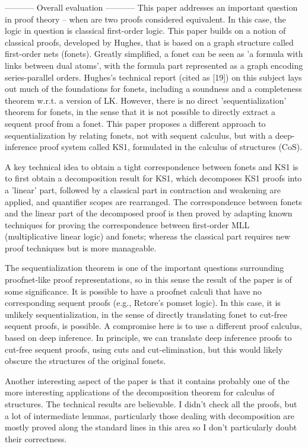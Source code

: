 ----------- Overall evaluation -----------
This paper addresses an important question in proof theory -- when are two proofs considered equivalent. In this case, the logic in question is classical first-order logic. This paper builds on a notion of classical proofs, developed by Hughes, that is based on a graph structure called first-order nets (fonets). Greatly simplified, a fonet can be seen as 'a formula with links between dual atoms', with the formula part represented as a graph encoding series-parallel orders.
Hughes's technical report (cited as [19]) on this subject lays out much of the foundations for fonets, including a soundness and a completeness theorem w.r.t. a version of LK. However, there is no direct 'sequentialization' theorem for fonets, in the sense that it is not possible to directly extract a sequent proof from a fonet. This paper proposes a different approach to sequentialization by relating fonets, not with sequent calculus, but with a deep-inference proof system called KS1, formulated in the calculus of structures (CoS).

A key technical idea to obtain a tight correspondence between fonets and KS1 is to first obtain a decomposition result for KS1, which decomposes KS1 proofs into a 'linear' part, followed by a classical part in contraction and weakening are applied, and quantifier scopes are rearranged.
The correspondence between fonets and the linear part of the decomposed proof is then proved by adapting known techniques for proving the correspondence between first-order MLL (multiplicative linear logic) and fonets; whereas the classical part requires new proof techniques but is more manageable.

The sequentialization theorem is one of the important questions surrounding proofnet-like proof representations, so in this sense the result of the paper is of some significance. It is possible to have a proofnet calculi that have no corresponding sequent proofs (e.g., Retore's pomset logic). In this case, it is unlikely sequentialization, in the sense of directly translating fonet to cut-free sequent proofs, is possible. A compromise here is to use a different proof calculus, based on deep inference. In principle, we can translate deep inference proofs to cut-free sequent proofs, using cuts and cut-elimination, but this would likely obscure the structures of the original fonets.

Another interesting aspect of the paper is that it contains probably one of the more interesting applications of the decomposition theorem for calculus of structures. The technical results are believable. I didn't check all the proofs, but a lot of intermediate lemmas, particularly those dealing with decomposition are mostly proved along the standard lines in this area so I don't particularly doubt their correctness.


